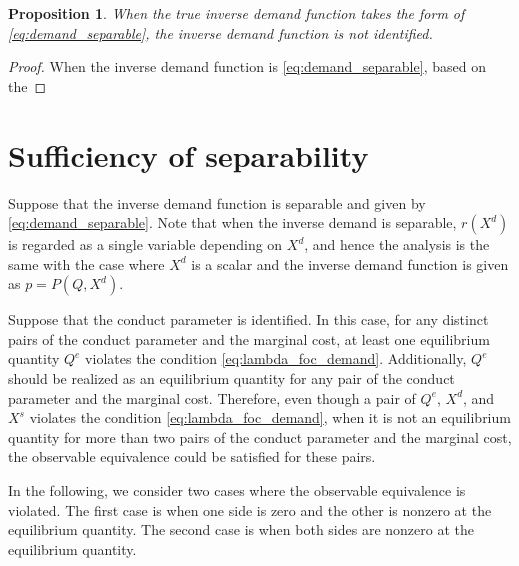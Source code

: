 \documentclass[11pt, a4paper]{article}
\newtheorem{proposition}{Proposition}
\theoremstyle{remark}
\begin{document}
\begin{proposition}
    When the true inverse demand function takes the form of \eqref{eq:demand_separable}, the inverse demand function is not identified. 
\end{proposition}



\begin{proof}
When the inverse demand function is \eqref{eq:demand_separable}, based on the 
\end{proof}









\section{Sufficiency of separability}

Suppose that the inverse demand function is separable and given by \eqref{eq:demand_separable}.
Note that when the inverse demand is separable, $r(X^{d})$ is regarded as a single variable depending on $X^{d}$, and hence the analysis is the same with the case where $X^{d}$ is a scalar and the inverse demand function is given as $p = P(Q, X^{d})$.

Suppose that the conduct parameter is identified.
In this case, for any distinct pairs of the conduct parameter and the marginal cost, at least one equilibrium quantity $Q^e$ violates the condition \eqref{eq:lambda_foc_demand}.
Additionally, $Q^e$ should be realized as an equilibrium quantity for any pair of the conduct parameter and the marginal cost.
Therefore, even though a pair of $Q^e$, $X^{d}$, and $X^{s}$ violates the condition \eqref{eq:lambda_foc_demand}, when it is not an equilibrium quantity for more than two pairs of the conduct parameter and the marginal cost, the observable equivalence could be satisfied for these pairs.

In the following, we consider two cases where the observable equivalence is violated.
The first case is when one side is zero and the other is nonzero at the equilibrium quantity.
The second case is when both sides are nonzero at the equilibrium quantity.
\end{document}
